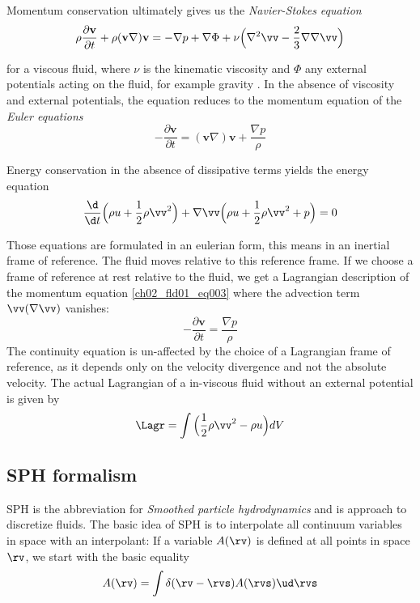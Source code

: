 Momentum conservation ultimately gives us the \emph{Navier-Stokes equation} 
\begin{equation}
\label{ch02_fld01_eq002}
\rho \frac{\partial \mathbf{v}}{\partial t} + \rho ( \mathbf{v} \nabla ) \mathbf{v} = - \nabla p + \nabla \Phi + \nu \Big( \nabla^2 \vv - \frac{2}{3} \nabla \nabla \vv \Big)
\end{equation}

for a viscous fluid, where $\nu$ is the kinematic viscosity and $\Phi$ any external potentials acting on the fluid, for example gravity \citep{shore2007astrophysical}. In the absence of viscosity and external potentials, the equation reduces  to the momentum equation of the \emph{Euler equations}
\begin{equation}
\label{ch02_fld01_eq003}
- \frac{\partial \mathbf{v}}{\partial t} =  ( \mathbf{v} \nabla ) \mathbf{v} + \frac{\nabla p}{\rho}
\end{equation}

Energy conservation in the absence of dissipative terms yields the energy equation
\begin{equation}
\label{ch02_fld01_eq003a}
\frac{\d}{\d t} \Big( \rho u + \frac{1}{2}\rho \vv^2 \Big) + \nabla \vv\Big( \rho u + \frac{1}{2} \rho \vv^2 + p \Big) = 0
\end{equation}

Those equations are formulated in an eulerian form, this means in an inertial frame of reference. The fluid moves relative to this reference frame. If we choose a frame of reference at rest relative to the fluid, we get a Lagrangian description of the momentum equation \ref{ch02_fld01_eq003} where the advection term $\vv (\nabla \vv)$ vanishes:
\begin{equation}
\label{ch02_fld01_eq003b}
- \frac{\partial \mathbf{v}}{\partial t} = \frac{\nabla p}{\rho}
\end{equation}
The continuity equation is un-affected by the choice of a Lagrangian frame of reference, as it depends only on the velocity divergence and not the absolute velocity. The actual Lagrangian of a in-viscous fluid without an external potential is given by
\begin{equation}
\label{ch02_fld01_eq004}
\Lagr = \int \Big( \frac{1}{2} \rho \vv ^2 - \rho u \Big) dV
\end{equation}

\subsection{SPH formalism}
SPH is the abbreviation for \emph{Smoothed particle hydrodynamics} and is approach to discretize fluids. The basic idea of SPH is to interpolate all continuum variables in space with an interpolant: If a variable $A(\rv)$ is defined at all points in space $\rv$, we start with the basic equality
\begin{equation}
\label{ch02_sph01_eq001}
A(\rv) = \int  \delta(\rv - \rvs) A(\rvs) \ud \rvs
\end{equation}

